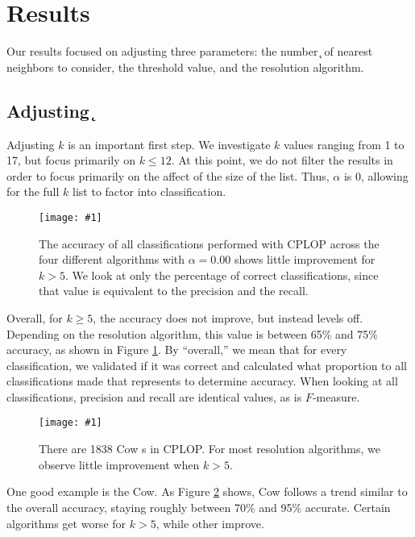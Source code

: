\section{Results}\label{sec:results:krap}
Our results focused on adjusting three parameters: the number \k{} of nearest neighbors to consider, the \a{} threshold value, and the resolution algorithm.
\newcommand{\krapfigurewidth}{\linewidth}
\newcommand{\krapfigure}[1]{\texttt{[image: \#1]}}

\subsection{Adjusting \k{}}
Adjusting $k$ is an important first step. We investigate $k$ values ranging from 1 to 17, but focus primarily on $k \leq 12$. At this point, we do not filter the results in order to focus primarily on the affect of the size of the \knn{} list. Thus, $\alpha$ is 0, allowing for the full $k$ list to factor into classification.

\begin{figure}[t]
\centering
\krapfigure{figures/krap/Overall-ALL-metrics-12-0_000_new}
\caption{The accuracy  of all classifications performed with CPLOP across the four different algorithms with $\alpha=0.00$ shows little improvement for $k>5$. We look at only the percentage of correct classifications, since that value is equivalent to the precision and the recall.}
\label{fig:k_overall}
\end{figure}
Overall, for $k\geq5$, the accuracy does not improve, but instead levels off. Depending on the resolution algorithm, this value is between 65\% and 75\% accuracy, as shown in Figure \ref{fig:k_overall}. By ``overall,'' we mean that for every classification, we validated if it was correct and calculated what proportion to all classifications made that represents to determine accuracy. When looking at all classifications, precision and recall are identical values, as is $F$-measure.


\begin{figure}[t]
\centering
\krapfigure{figures/krap/Cow-ALL-metrics-12-0_000}
\caption{There are 1838 Cow \isol{}s in CPLOP. For most resolution algorithms, we observe little improvement when $k>5$.}
\label{fig:k_cow}
\end{figure}
One good example is the Cow. As Figure \ref{fig:k_cow} shows, Cow follows a trend similar to the overall accuracy, staying roughly between 70\% and 95\% accurate. Certain algorithms get worse for $k>5$, while other improve.

